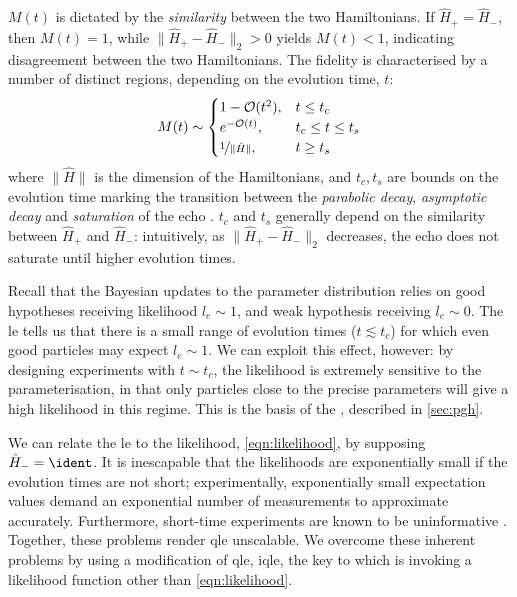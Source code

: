 $M(t)$ is dictated by the \emph{similarity} between the two Hamiltonians.
If $\hat{H}_{+} = \hat{H}_{-}$, then $M(t) = 1$, while $\|\hat{H}_{+} - \hat{H}_{-} \|_2 > 0$ yields $M(t) < 1$, 
    indicating disagreement between the two Hamiltonians. 
The fidelity is characterised by a number of distinct regions, depending on the evolution time, $t$:
\begin{align}
    \label{eqn:loschmidt_ranges}
    M(t) \sim 
    \begin{cases}
        1 - \mathcal{O}(t^2),  & t \leq t_c \\
        e^{-\mathcal{O}(t)}, & t_c \leq t \leq t_{s} \\
        \nicefrac{1}{\| \hat{H} \|}, & t \geq t_{s}
    \end{cases}
\end{align}
    where $\|\hat{H}\|$ is the dimension of the Hamiltonians, and $t_c, t_{s}$ are bounds on the evolution time marking the transition between the 
    \emph{parabolic decay}, \emph{asymptotic decay} and \emph{saturation} of the echo \cite{goussev2012loschmidt}. 
$t_c$ and $t_s$ generally depend on the similarity between $\hat{H}_+$ and $\hat{H}_{-}$: 
    intuitively, as $\|\hat{H}_+ - \hat{H}_{-}\|_2$ decreases, the echo does not saturate until higher evolution times. 
\par 

Recall that the Bayesian updates to the parameter distribution relies on good hypotheses receiving likelihood $l_e \sim 1$,
    and weak hypothesis receiving $l_e \sim 0$. 
The \gls{le} tells us that there is a small range of evolution times ($t \lesssim t_c$) for which even good particles may expect $l_e \sim 1$.
We can exploit this effect, however: 
    by designing experiments with $t \sim t_c$, the likelihood is extremely sensitive to the parameterisation, 
    in that only particles close to the precise parameters will give a high likelihood in this regime. 
This is the basis of the , described in \cref{sec:pgh}. 
\par 

We can relate the \gls{le} to the likelihood, \cref{eqn:likelihood}, by supposing $\hat{H}_{-} = \ident$. 
It is inescapable that the \glspl{likelihood} are exponentially small if the evolution times are not short;
    experimentally, exponentially small expectation values demand an exponential number of measurements to approximate accurately.
Furthermore, short-time experiments are known to be uninformative \cite{wiebe2014qhlpra, wiebe2015quantum}.
Together, these problems render \gls{qle} unscalable.
We overcome these inherent problems by using a modification of \gls{qle}, \gls{iqle},
    the key to which is invoking a \gls{likelihood} function other than \cref{eqn:likelihood}.
    
